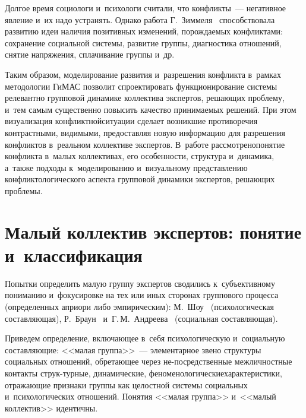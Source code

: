 \begin{multicols}{2}
  
  Долгое время социологи и~психологи считали, что конфликты~--- негативное 
явление и~их надо устранять. Однако работа Г.~Зиммеля~\cite{3-r} 
способствовала развитию идеи наличия позитивных изменений, порождаемых 
конфликтами: сохранение социальной системы, развитие группы, диагностика 
отношений, снятие напряжения, сплачивание группы и~др. 
  
  Таким образом, моделирование развития и~разрешения конфликта в~рамках 
методологии ГиМАС позволит спроектировать функционирование сис\-те\-мы 
релевантно групповой динамике коллектива экспертов, решающих проб\-ле\-му, 
и~тем самым существенно повысить качество принимаемых ре\-шений. При 
этом визуализация конфликтной\linebreak си\-туации сделает возникшие противоречия 
контрастными, видимыми, предоставляя новую информацию для разрешения 
конфликтов в~реальном коллективе экспертов. В~работе рассмотрено\linebreak понятие 
конфликта в~малых коллективах, его особенности, структура и~динамика, 
а~также подходы к~моделированию и~визуальному представлению 
конфликтологического аспекта групповой динамики экспертов, решающих 
проблемы. 

\vspace*{-6pt}
  
\section{Малый коллектив экспертов: понятие и~классификация}

\vspace*{-2pt}
  
  Попытки определить малую группу экспертов сводились к~субъективному 
пониманию и~фокусировке на тех или иных сторонах группового процесса 
(определенных априори либо эмпирическим): М.~Шоу~\cite{4-r} 
(психологическая со\-став\-ля\-ющая), Р.~Браун~\cite{5-r} 
и~Г.\,М.~Андреева~\cite{6-r} (социальная составляющая). 
  
  Приведем определение, включающее в~себя психологическую и~социальную 
составляющие: <<малая группа>>~--- элементарное звено структуры 
социальных отношений, обретающее через не-\linebreak посредственные межличностные 
контакты струк-\linebreak турные, динамические, феноменологические\linebreak характеристики, 
отражающие признаки группы как целостной сис\-те\-мы социальных 
и~психологических отношений. Понятия <<малая группа>> и~<<малый 
коллектив>> идентичны.
  

\end{multicols}
